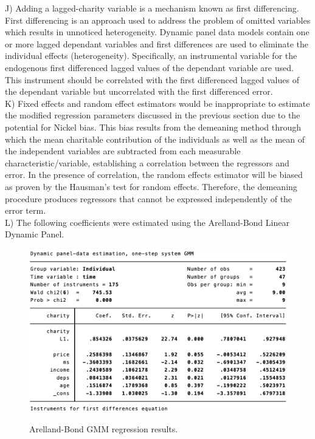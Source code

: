 \documentclass[12pt]{article}
\begin{document}
J) Adding a lagged-charity variable is a mechanism known as first differencing. First differencing is an approach used to address the problem of omitted variables which results in unnoticed heterogeneity. Dynamic panel data models contain one or more lagged dependant variables and first differences are used to eliminate the individual effects (heterogeneity). Specifically, an instrumental variable for the endogenous first differenced lagged values of the dependant variable are used. This instrument should be correlated with the first differenced lagged values of the dependant variable but uncorrelated with the first differenced error.\\
\break
K) Fixed effects and random effect estimators would be inappropriate to estimate the modified regression parameters discussed in the previous section due to the potential for Nickel bias. This bias results from the demeaning method through which the mean charitable contribution of the individuals as well as the mean of the independent variables are subtracted from each measurable characteristic/variable, establishing a correlation between the regressors and error. In the presence of correlation, the random effects estimator will be biased as proven by the Hausman's test for random effects. Therefore, the demeaning procedure produces regressors that cannot be expressed independently of the error term.\\
\newpage
L) The following coefficients were estimated using the Arelland-Bond Linear Dynamic Panel.
\begin{figure}[h!]
\begin{center}
\includegraphics[scale=0.85]{GMM.png}
\label{}
\caption{Arelland-Bond GMM regression results.}
\end{center}
\end{figure}
\end{document}
